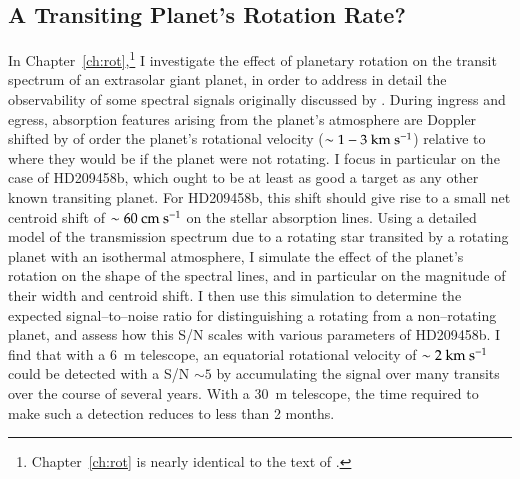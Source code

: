 \subsection[A Transiting Planet's Rotation Rate?]{A Transiting Planet's Rotation Rate?}
\label{intro_ssec:rot}
In Chapter~\ref{ch:rot},\footnote{Chapter~\ref{ch:rot} is nearly
identical to the text of \citet{spiegel_et_al2007b}.} I investigate
the effect of planetary rotation on the transit spectrum of an
extrasolar giant planet, in order to address in detail the
observability of some spectral signals originally discussed by
\citet{brown2001}.  During ingress and egress, absorption features
arising from the planet's atmosphere are Doppler shifted by of order
the planet's rotational velocity ($\sim 1-3 {\rm ~km~s^{-1}}$)
relative to where they would be if the planet were not rotating.  I
focus in particular on the case of HD209458b, which ought to be at
least as good a target as any other known transiting planet.  For
HD209458b, this shift should give rise to a small net centroid shift
of $\sim 60 {\rm ~cm~s^{-1}}$ on the stellar absorption lines.  Using
a detailed model of the transmission spectrum due to a rotating star
transited by a rotating planet with an isothermal atmosphere, I
simulate the effect of the planet's rotation on the shape of the
spectral lines, and in particular on the magnitude of their width and
centroid shift.  I then use this simulation to determine the expected
signal--to--noise ratio for distinguishing a rotating from a
non--rotating planet, and assess how this S/N scales with various
parameters of HD209458b.  I find that with a 6~m telescope, an
equatorial rotational velocity of $\sim 2 {\rm ~km~s^{-1}}$ could be
detected with a S/N $\sim 5$ by accumulating the signal over many
transits over the course of several years.  With a 30~m telescope, the
time required to make such a detection reduces to less than 2 months.

